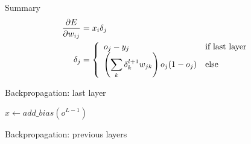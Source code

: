 \begin{frame}{Summary}
  \begin{equation*}
    \begin{split}
      \frac{\partial{E}}{\partial w_{ij}} & = x_i \delta_j\\
      \delta_j & = \left\{
      \begin{array}{ll}
        o_j - y_j & $if last layer$ \\
        \left(\displaystyle\sum_k{\delta^{l + 1}_k w_{jk}}\right)  o_j (1 - o_j) & $else$
      \end{array}\right.
    \end{split}
  \end{equation*}
\end{frame}

\begin{frame}{Backpropagation: last layer}
\begin{algorithm}[H]
$x \gets add\_bias(o^{L-1})$\;
\end{algorithm}
\end{frame}

\begin{frame}{Backpropagation: previous layers}
\begin{algorithm}[H]
\end{algorithm}
\end{frame}
